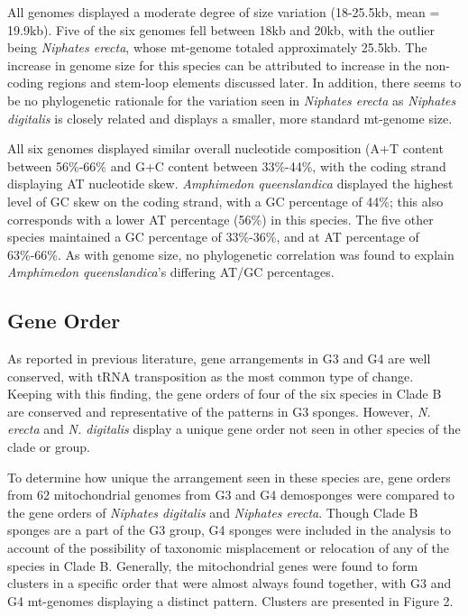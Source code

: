\documentclass[../main.tex]{subfiles}
\begin{document}
All genomes displayed a moderate degree of size variation (18-25.5kb, mean = 19.9kb). Five of the six genomes fell between 18kb and 20kb, with the outlier being \emph{Niphates erecta}, whose mt-genome totaled approximately 25.5kb. The increase in genome size for this species can be attributed to increase in the non-coding regions and stem-loop elements discussed later. In addition, there seems to be no phylogenetic rationale for the variation seen in \emph{Niphates erecta} as \emph{Niphates digitalis} is closely related and displays a smaller, more standard mt-genome size.

All six genomes displayed similar overall nucleotide composition (A+T content between 56\%-66\% and G+C content between 33\%-44\%, with the coding strand displaying AT nucleotide skew. \emph{Amphimedon queenslandica} displayed the highest level of GC skew on the coding strand, with a GC percentage of 44\%; this also corresponds with a lower AT percentage (56\%) in this species. The five other species maintained a GC percentage of 33\%-36\%, and at AT percentage of 63\%-66\%. As with genome size, no phylogenetic correlation was found to explain \emph{Amphimedon queenslandica}'s differing AT/GC percentages.

\subsection{Gene Order}

As reported in previous literature, gene arrangements in  G3 and G4 are well conserved, with tRNA transposition as the most common type of change. Keeping with this finding, the gene orders of four of the six species in Clade B are conserved and representative of the patterns in G3 sponges. However, \emph{N. erecta} and \emph{N. digitalis} display a unique gene order not seen in other species of the clade or group.

To determine how unique the arrangement seen in these species are, gene orders from 62 mitochondrial genomes from G3 and G4 demosponges were compared to the gene orders of \emph{Niphates digitalis} and \emph{Niphates erecta}. Though Clade B sponges are a part of the G3 group, G4 sponges were included in the analysis to account of the possibility of taxonomic misplacement or relocation of any of the species in Clade B. Generally, the mitochondrial genes were found to form clusters in a specific order that were almost always found together, with G3 and G4 mt-genomes displaying a distinct pattern. Clusters are presented in Figure 2.
\end{document}
